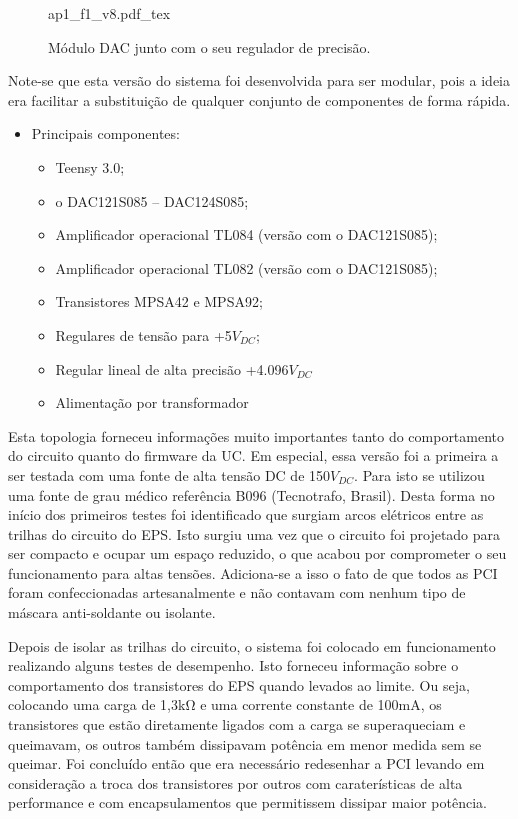 \begin{figure*}[h]
    \centering %
    \small %
    \def\svgwidth{0.7\columnwidth}%
    {ap1_f1_v8.pdf_tex}
    \caption{Módulo DAC junto com o seu regulador de precisão.}
    \label{fig:ap1_f1_v8}
\end{figure*}

Note-se que esta versão do sistema foi desenvolvida para ser modular, pois a ideia era facilitar a substituição de qualquer conjunto de componentes de forma rápida.

\begin{itemize}
    \item Principais componentes:
    \begin{itemize}
        \item Teensy 3.0;
        \item o	DAC121S085 – DAC124S085;
        \item Amplificador operacional TL084 (versão com o DAC121S085);
        \item Amplificador operacional TL082 (versão com o DAC121S085);
        \item Transistores MPSA42 e MPSA92;
        \item Regulares de tensão para +5$V_{DC}$;
        \item Regular lineal de alta precisão +4.096$V_{DC}$
        \item Alimentação por transformador
    \end{itemize}
\end{itemize}

Esta topologia forneceu informações muito importantes tanto do comportamento do circuito quanto do firmware da \acrshort{UC}. Em especial, essa versão foi a primeira a ser testada com uma fonte de alta tensão DC de 150$V_{DC}$. Para isto se utilizou uma fonte de grau médico referência B096 (Tecnotrafo, Brasil). Desta forma no início dos primeiros testes foi identificado que surgiam arcos elétricos entre as trilhas do circuito do EPS. Isto surgiu uma vez que o circuito foi projetado para ser compacto e ocupar um espaço reduzido, o que acabou por comprometer o seu funcionamento para altas tensões. Adiciona-se a isso o fato de que todos as \acrshort{PCI} foram confeccionadas artesanalmente e não contavam com nenhum tipo de máscara anti-soldante ou isolante.

Depois de isolar as trilhas do circuito, o sistema foi colocado em funcionamento realizando alguns testes de desempenho. Isto forneceu informação sobre o comportamento dos transistores do \acrshort{EPS} quando levados ao limite. Ou seja, colocando uma carga de 1,3k$\mathrm{\Omega}$ e uma corrente constante de 100mA, os transistores que estão diretamente ligados com a carga se superaqueciam e queimavam, os outros também dissipavam potência em menor medida sem se queimar. Foi concluído então que era necessário redesenhar a \acrshort{PCI} levando em consideração a troca dos transistores por outros com caraterísticas de alta performance e com encapsulamentos que permitissem dissipar maior potência.

